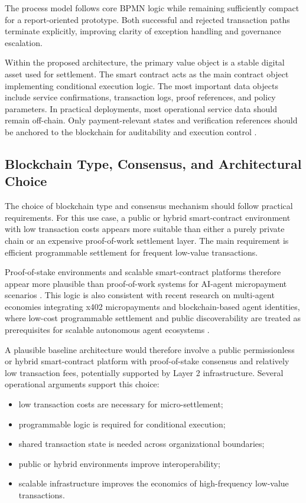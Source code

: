 \documentclass[12pt,a4paper,oneside]{article}
\theoremstyle{definition}
\theoremstyle{plain}
\begin{document}
The process model follows core BPMN logic while remaining sufficiently compact for a report-oriented prototype. Both successful and rejected transaction paths terminate explicitly, improving clarity of exception handling and governance escalation.

Within the proposed architecture, the primary value object is a stable digital asset used for settlement. The smart contract acts as the main contract object implementing conditional execution logic. The most important data objects include service confirmations, transaction logs, proof references, and policy parameters. In practical deployments, most operational service data should remain off-chain. Only payment-relevant states and verification references should be anchored to the blockchain for auditability and execution control \citep{krueger2026workshop2,krueger2026workshop7a}.

\subsection{Blockchain Type, Consensus, and Architectural Choice}

The choice of blockchain type and consensus mechanism should follow practical requirements. For this use case, a public or hybrid smart-contract environment with low transaction costs appears more suitable than either a purely private chain or an expensive proof-of-work settlement layer. The main requirement is efficient programmable settlement for frequent low-value transactions.

Proof-of-stake environments and scalable smart-contract platforms therefore appear more plausible than proof-of-work systems for AI-agent micropayment scenarios \citep{krueger2026intro2,buterin2014ethereum}. This logic is also consistent with recent research on multi-agent economies integrating x402 micropayments and blockchain-based agent identities, where low-cost programmable settlement and public discoverability are treated as prerequisites for scalable autonomous agent ecosystems \citep{vaziry2025multiagent}.

A plausible baseline architecture would therefore involve a public permissionless or hybrid smart-contract platform with proof-of-stake consensus and relatively low transaction fees, potentially supported by Layer 2 infrastructure. Several operational arguments support this choice:

\begin{itemize}[leftmargin=1.2cm]
\item low transaction costs are necessary for micro-settlement;
\item programmable logic is required for conditional execution;
\item shared transaction state is needed across organizational boundaries;
\item public or hybrid environments improve interoperability;
\item scalable infrastructure improves the economics of high-frequency low-value transactions.
\end{itemize}
\end{document}
